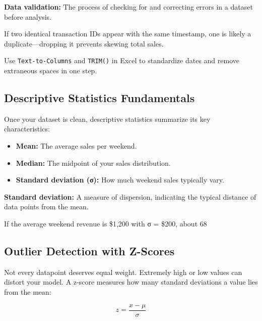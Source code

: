 \begin{Definition}
\textbf{Data validation:} The process of checking for and correcting errors in a dataset before analysis.
\end{Definition}

\begin{Example}
If two identical transaction IDs appear with the same timestamp, one is likely a duplicate—dropping it prevents skewing total sales.
\end{Example}

\begin{Tip}
Use \verb|Text-to-Columns| and \verb|TRIM()| in Excel to standardize dates and remove extraneous spaces in one step.
\end{Tip}

\subsection{Descriptive Statistics Fundamentals}
Once your dataset is clean, descriptive statistics summarize its key characteristics:

\begin{itemize}
  \item \textbf{Mean:} The average sales per weekend.
  \item \textbf{Median:} The midpoint of your sales distribution.
  \item \textbf{Standard deviation (σ):} How much weekend sales typically vary.
\end{itemize}

\begin{Definition}
\textbf{Standard deviation:} A measure of dispersion, indicating the typical distance of data points from the mean.
\end{Definition}

\begin{Example}
If the average weekend revenue is \$1,200 with σ = \$200, about 68 %
\end{Example}

\subsection{Outlier Detection with Z-Scores}
Not every datapoint deserves equal weight. Extremely high or low values can distort your model. A z-score measures how many standard deviations a value lies from the mean:

\[
z = \frac{x - \mu}{\sigma}
\]

